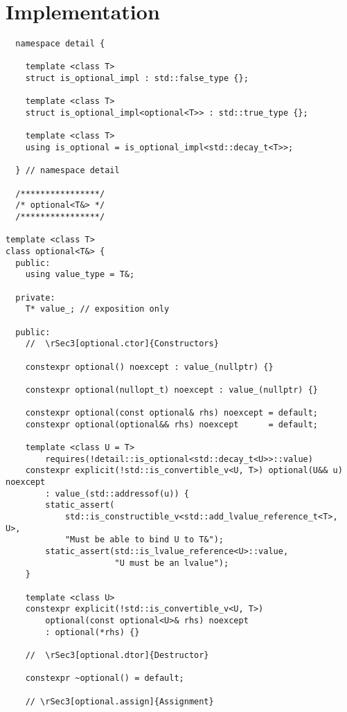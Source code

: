 \documentclass[a4paper,10pt,oneside,openany,final,article]{memoir}
\begin{document}
\renewcommand{\bibname}{References}



\chapter*{Implementation}

\begin{verbatim}
  namespace detail {

    template <class T>
    struct is_optional_impl : std::false_type {};

    template <class T>
    struct is_optional_impl<optional<T>> : std::true_type {};

    template <class T>
    using is_optional = is_optional_impl<std::decay_t<T>>;

  } // namespace detail

  /****************/
  /* optional<T&> */
  /****************/

template <class T>
class optional<T&> {
  public:
    using value_type = T&;

  private:
    T* value_; // exposition only

  public:
    //  \rSec3[optional.ctor]{Constructors}

    constexpr optional() noexcept : value_(nullptr) {}

    constexpr optional(nullopt_t) noexcept : value_(nullptr) {}

    constexpr optional(const optional& rhs) noexcept = default;
    constexpr optional(optional&& rhs) noexcept      = default;

    template <class U = T>
        requires(!detail::is_optional<std::decay_t<U>>::value)
    constexpr explicit(!std::is_convertible_v<U, T>) optional(U&& u) noexcept
        : value_(std::addressof(u)) {
        static_assert(
            std::is_constructible_v<std::add_lvalue_reference_t<T>, U>,
            "Must be able to bind U to T&");
        static_assert(std::is_lvalue_reference<U>::value,
                      "U must be an lvalue");
    }

    template <class U>
    constexpr explicit(!std::is_convertible_v<U, T>)
        optional(const optional<U>& rhs) noexcept
        : optional(*rhs) {}

    //  \rSec3[optional.dtor]{Destructor}

    constexpr ~optional() = default;

    // \rSec3[optional.assign]{Assignment}


\end{verbatim}
\end{document}

